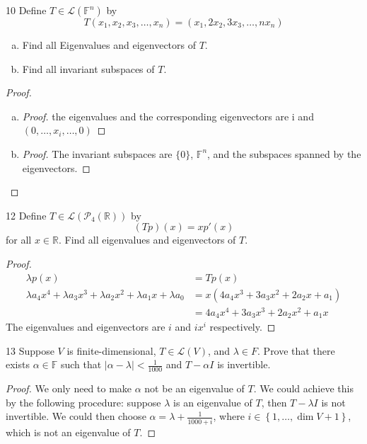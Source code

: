 \documentclass{article}
\newenvironment{problem}[1]{\begin{prob*}{#1}{}}{\end{prob*}}
\begin{document}
\begin{problem}{10}
Define $T \in \mathcal{L}(\mathbb{F}^n)$ by \[
	T(x_1,x_2,x_3, \ldots ,x_n) = (x_1,2x_2,3x_3, \ldots ,n x_n)\]
\begin{enumerate}[(a)]
	\item Find all Eigenvalues and eigenvectors of $T$.
	\item Find all invariant subspaces of $T$.
\end{enumerate}
\end{problem}
\begin{proof}
	\begin{enumerate}[(a)]
		\item
		      \begin{proof}
			      the eigenvalues and the corresponding eigenvectors are i and $(0, \ldots ,x_i, \ldots ,0)$
		      \end{proof}
		\item \begin{proof}
			      The invariant subspaces are $\{0\}$, $\mathbb{F}^n$, and the subspaces spanned by the eigenvectors.
		      \end{proof}
	\end{enumerate}
\end{proof}

\newpage
\begin{problem}{12}
Define $T \in \mathcal{L}(\mathcal{P}_4(\mathbb{R}))$ by \[
	(Tp)(x) = x p'(x)\]
for all $x \in \mathbb{R}$. Find all eigenvalues and eigenvectors of $T$.
\end{problem}
\begin{proof}
	\begin{align*}
		\lambda p(x) & = Tp(x)                            \\
		\lambda a_4x^4 + \lambda a_3x^{3} + \lambda a_2x^{2} + \lambda a_1 x + \lambda a_0
		             & = x (4a_4  x^3+3a_3x^2+2a_2 x+a_1) \\
		             & = 4a_4 x^4+3a_3x^3+2a_2 x^2+a_1 x
	\end{align*}
	The eigenvalues and eigenvectors are $i$ and $ix^i$ respectively.
\end{proof}

\begin{problem}{13}
Suppose $V$ is finite-dimensional, $T \in \mathcal{L}(V)$, and $\lambda \in F$. Prove that there exists $\alpha \in \mathbb{F}$ such that $\left\vert \alpha - \lambda \right\vert < \frac{1}{1000}$ and $T - \alpha I$ is invertible.
\end{problem}
\begin{proof}
	We only need to make $\alpha$ not be an eigenvalue of $T$. We could achieve this by the following procedure:
	suppose $\lambda$ is an eigenvalue of $T$, then $T - \lambda I$ is not invertible. We could then choose $\alpha = \lambda + \frac{1}{1000 + i}$, where $i \in \left\{1, \ldots ,\operatorname{dim}V + 1\right\}$, which is not an eigenvalue of $T$.
\end{proof}
\end{document}
